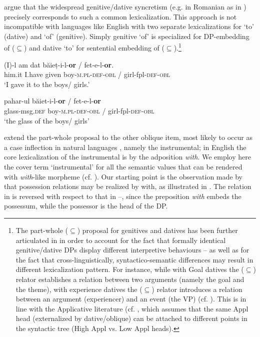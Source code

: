 \documentclass[output=paper,modfonts,nonflat,newtxmath,colorlinks,citecolor=brown]{langsci/langscibook}
\begin{document}
\citet{ManziniSavoia2011} argue that the widespread genitive/dative syncretism (e.g. in Romanian as in ) precisely corresponds to such a common lexicalization. This approach is not incompatible with languages like English with two separate lexicalizations for ‘to’ (dative) and ‘of’ (genitive). Simply genitive ‘of’ is specialized for DP-embedding of (${\subseteq}$) and dative ‘to’ for sentential embedding of (${\subseteq}$).\footnote{The part-whole (\textrm{${\subseteq}$}) proposal for genitives and datives has been further articulated in \citet{ManziniFranco2016, FrancoManzini2017Gen} in order to account for the fact that formally identical genitive/dative DPs display different interpretive behaviours – as well as for the fact that cross-linguistically, syntactico-semantic differences may result in different lexicalization pattern. For instance, while with Goal datives the (\textrm{${\subseteq}$}) relator establishes a relation between two arguments (namely the goal and the theme), with experience datives the (\textrm{${\subseteq}$}) relator introduces a relation between an argument (experiencer) and an event (the VP) (cf. \citealt[230--231]{ManziniFranco2016}). This is in line with the Applicative literature (cf. \citealt{Pylkkänen2008}, which assumes that the same Appl head (externalized by dative/oblique) can be attached to different points in the syntactic tree (High Appl {vs}. Low Appl heads).} 

\ea%
    \label{ex:franco:3}
    \ea
    \gll (I)-l am dat băieț-i-l-\textbf{or} / fet-e-l-\textbf{or}. \\
        him.it I.have given boy-\textsc{m.pl}-\textsc{def}-\textsc{obl} / girl-fpl-\textsc{def}-\textsc{obl}\\
    \glt ‘I gave it to the boys/ girls.’
    
     \ex
    \gll pahar-ul băiet-i-l-\textbf{or} / fet-e-l-\textbf{or} \\
        glass-msg.\textsc{def} boy-\textsc{m.pl}-\textsc{def}-\textsc{obl} / girl-fpl-\textsc{def}-\textsc{obl}\\
    \glt ‘the glass of the boys/ girls’ 
    \z
    \z


\citet{FrancoManzini2017Ins} extend the part-whole proposal to the other oblique item, most likely to occur as a case inflection in natural languages \citep{Caha2009}, namely the instrumental; in English the core lexicalization of the instrumental is by the adposition \textit{with}. We employ here the cover term ‘instrumental’ for all the semantic values that can be rendered with \textit{with}-like morpheme (cf. \citealt{StolzStrohUrdze2006}). Our starting point is the observation made by \citet{Levinson2011} that possession relations may be realized by {with}, as illustrated in . The relation in  is reversed with respect to that in --, since the preposition \textit{with} embeds the {possessum}, while the possessor is the head of the DP.
\end{document}
